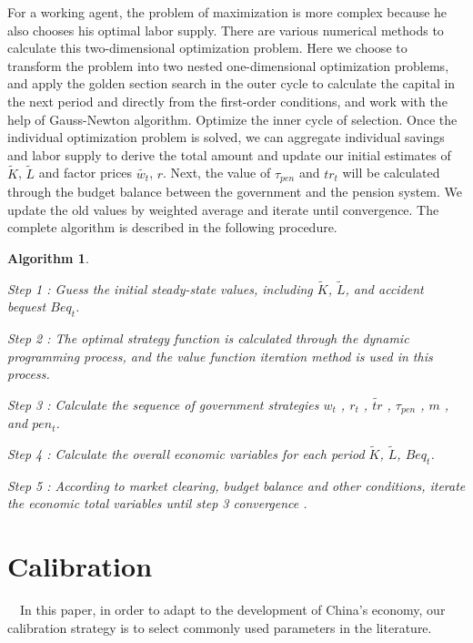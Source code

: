 \documentclass{article}
\newtheorem{algorithm}{Algorithm}[section]
\begin{document}
    For a working agent, the problem of maximization is more complex because he also chooses his optimal labor supply. 
    There are various numerical methods to calculate this two-dimensional optimization problem. 
    Here we choose to transform the problem into two nested one-dimensional optimization problems, 
    and apply the golden section search in the outer cycle to calculate the capital in the next period and directly 
    from the first-order conditions, and work with the help of Gauss-Newton algorithm. Optimize the inner cycle 
    of selection. Once the individual optimization problem is solved, we can aggregate individual savings and labor 
    supply to derive the total amount and update our initial estimates of $\tilde{K}$, $\tilde{L}$ and factor prices 
    $\tilde{w_t}$, $r$. Next, the value of $\tau_{pen}$ and $tr_t$ will be calculated through the budget balance 
    between the government and the pension system. We update the old values by weighted average and iterate until 
    convergence. The complete algorithm is described in the following procedure.

    \begin{algorithm}
        ~\

        Step 1 : Guess the initial steady-state values, including $\tilde{K}$, $\tilde{L}$, and accident bequest $Beq_t$.
        
        Step 2 : The optimal strategy function is calculated through the dynamic programming process, and the value function iteration method is used in this process.

        Step 3 : Calculate the sequence of government strategies $w_t$ , $r_t$ , $\tilde{tr}$ , $\tau_{pen}$ , $m$ , and $pen_t$.

        Step 4 : Calculate the overall economic variables for each period $\tilde{K}$, $\tilde{L}$, $Beq_t$.

        Step 5 : According to market clearing, budget balance and other conditions, iterate the economic total variables until step 3 convergence . 
    
    \end{algorithm}




\section{Calibration}
    ~\
    In this paper, in order to adapt to the development of China's economy, our calibration strategy is to select commonly used parameters in the literature.
\end{document}
